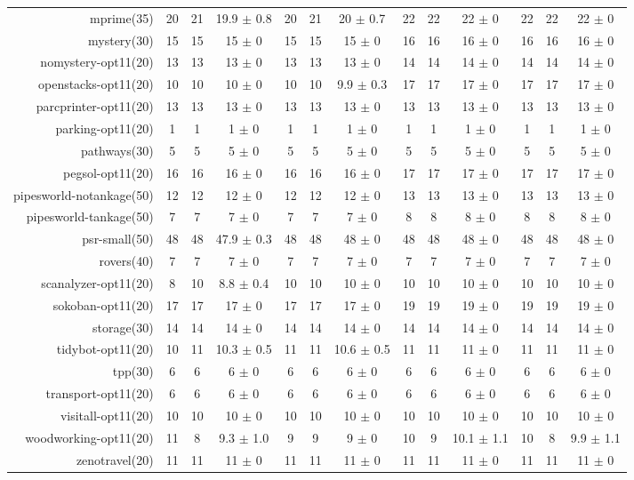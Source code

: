 \begin{center}
\begin{tabular}{|r|*{4}{ccc|}}
mprime(35) & 20 & 21 & 19.9 $\pm$ 0.8 & 20 & 21 & 20 $\pm$ 0.7 & 22 & 22 & 22 $\pm$ 0 & 22 & 22 & 22 $\pm$ 0\\
mystery(30) & 15 & 15 & 15 $\pm$ 0 & 15 & 15 & 15 $\pm$ 0 & 16 & 16 & 16 $\pm$ 0 & 16 & 16 & 16 $\pm$ 0\\
nomystery-opt11(20) & 13 & 13 & 13 $\pm$ 0 & 13 & 13 & 13 $\pm$ 0 & 14 & 14 & 14 $\pm$ 0 & 14 & 14 & 14 $\pm$ 0\\
openstacks-opt11(20) & 10 & 10 & 10 $\pm$ 0 & 10 & 10 & 9.9 $\pm$ 0.3 & 17 & 17 & 17 $\pm$ 0 & 17 & 17 & 17 $\pm$ 0\\
parcprinter-opt11(20) & 13 & 13 & 13 $\pm$ 0 & 13 & 13 & 13 $\pm$ 0 & 13 & 13 & 13 $\pm$ 0 & 13 & 13 & 13 $\pm$ 0\\
parking-opt11(20) & 1 & 1 & 1 $\pm$ 0 & 1 & 1 & 1 $\pm$ 0 & 1 & 1 & 1 $\pm$ 0 & 1 & 1 & 1 $\pm$ 0\\
pathways(30) & 5 & 5 & 5 $\pm$ 0 & 5 & 5 & 5 $\pm$ 0 & 5 & 5 & 5 $\pm$ 0 & 5 & 5 & 5 $\pm$ 0\\
pegsol-opt11(20) & 16 & 16 & 16 $\pm$ 0 & 16 & 16 & 16 $\pm$ 0 & 17 & 17 & 17 $\pm$ 0 & 17 & 17 & 17 $\pm$ 0\\
pipesworld-notankage(50) & 12 & 12 & 12 $\pm$ 0 & 12 & 12 & 12 $\pm$ 0 & 13 & 13 & 13 $\pm$ 0 & 13 & 13 & 13 $\pm$ 0\\
pipesworld-tankage(50) & 7 & 7 & 7 $\pm$ 0 & 7 & 7 & 7 $\pm$ 0 & 8 & 8 & 8 $\pm$ 0 & 8 & 8 & 8 $\pm$ 0\\
psr-small(50) & 48 & 48 & 47.9 $\pm$ 0.3 & 48 & 48 & 48 $\pm$ 0 & 48 & 48 & 48 $\pm$ 0 & 48 & 48 & 48 $\pm$ 0\\
rovers(40) & 7 & 7 & 7 $\pm$ 0 & 7 & 7 & 7 $\pm$ 0 & 7 & 7 & 7 $\pm$ 0 & 7 & 7 & 7 $\pm$ 0\\
scanalyzer-opt11(20) & 8 & 10 & 8.8 $\pm$ 0.4 & 10 & 10 & 10 $\pm$ 0 & 10 & 10 & 10 $\pm$ 0 & 10 & 10 & 10 $\pm$ 0\\
sokoban-opt11(20) & 17 & 17 & 17 $\pm$ 0 & 17 & 17 & 17 $\pm$ 0 & 19 & 19 & 19 $\pm$ 0 & 19 & 19 & 19 $\pm$ 0\\
storage(30) & 14 & 14 & 14 $\pm$ 0 & 14 & 14 & 14 $\pm$ 0 & 14 & 14 & 14 $\pm$ 0 & 14 & 14 & 14 $\pm$ 0\\
tidybot-opt11(20) & 10 & 11 & 10.3 $\pm$ 0.5 & 11 & 11 & 10.6 $\pm$ 0.5 & 11 & 11 & 11 $\pm$ 0 & 11 & 11 & 11 $\pm$ 0\\
tpp(30) & 6 & 6 & 6 $\pm$ 0 & 6 & 6 & 6 $\pm$ 0 & 6 & 6 & 6 $\pm$ 0 & 6 & 6 & 6 $\pm$ 0\\
transport-opt11(20) & 6 & 6 & 6 $\pm$ 0 & 6 & 6 & 6 $\pm$ 0 & 6 & 6 & 6 $\pm$ 0 & 6 & 6 & 6 $\pm$ 0\\
visitall-opt11(20) & 10 & 10 & 10 $\pm$ 0 & 10 & 10 & 10 $\pm$ 0 & 10 & 10 & 10 $\pm$ 0 & 10 & 10 & 10 $\pm$ 0\\
woodworking-opt11(20) & 11 & 8 & 9.3 $\pm$ 1.0 & 9 & 9 & 9 $\pm$ 0 & 10 & 9 & 10.1 $\pm$ 1.1 & 10 & 8 & 9.9 $\pm$ 1.1\\
zenotravel(20) & 11 & 11 & 11 $\pm$ 0 & 11 & 11 & 11 $\pm$ 0 & 11 & 11 & 11 $\pm$ 0 & 11 & 11 & 11 $\pm$ 0\\
\end{tabular}
\end{center}
